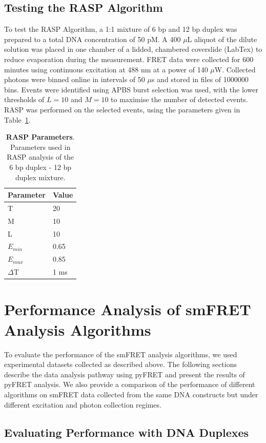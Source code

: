 \subsection{Testing the RASP Algorithm}
To test the RASP Algorithm, a 1:1 mixture of 6 bp and 12 bp duplex was prepared to a total DNA concentration of 50 pM. A 400 $\mu$L aliquot of the dilute solution was placed in one chamber of a lidded, chambered coverslide (LabTex) to reduce evaporation during the measurement. FRET data were collected for 600 minutes using continuous excitation at 488 nm at a power of 140 $\mu$W. Collected photons were binned online in intervals of 50 $\mu$s and stored in files of 1000000 bins. Events were identified using APBS burst selection was used, with the lower thresholds of $L = 10$ and $M = 10$ to maximise the number of detected events. RASP was performed on the selected events, using the parameters given in Table~\ref{tab:RASP}. 

\begin{table}[!ht]
\caption{
{\bf{RASP Parameters}}. Parameters used in RASP analysis of the 6 bp duplex - 12 bp duplex mixture.}
\begin{tabular}{|l|l|}
\hline
Parameter & Value \\
\hline
T & 20 \\
M & 10 \\
L & 10 \\
$E_{min}$ & 0.65 \\
$E_{max}$ & 0.85 \\
$\Delta$T & 1 ms \\
\hline
\end{tabular}

\label{tab:RASP}
\end{table}

\section{Performance Analysis of smFRET Analysis Algorithms}
To evaluate the performance of the smFRET analysis algorithms, we used experimental datasets collected as described above. The following sections describe the data analysis pathway using pyFRET and present the results of pyFRET analysis. We also provide a comparison of the performance of different algorithms on smFRET data collected from the same DNA constructs but under different excitation and photon collection regimes.

\subsection{Evaluating Performance with DNA Duplexes}
